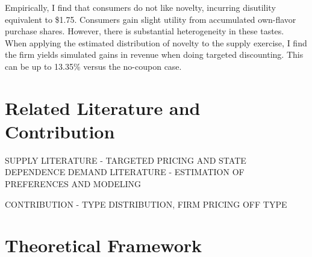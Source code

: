 \documentclass[12pt]{article}
\theoremstyle{definition}
\theoremstyle{remark}
\begin{document}
Empirically, I find that consumers do not like novelty, incurring disutility equivalent to \$1.75. Consumers gain slight utility from accumulated own-flavor purchase shares. However, there is substantial heterogeneity in these tastes. When applying the estimated distribution of novelty to the supply exercise, I find the firm yields simulated gains in revenue when doing targeted discounting. This can be up to 13.35\% versus the no-coupon case.



\section{Related Literature and Contribution}
\label{sec:literature}

SUPPLY LITERATURE - TARGETED PRICING AND STATE DEPENDENCE
DEMAND LITERATURE - ESTIMATION OF PREFERENCES AND MODELING

CONTRIBUTION - TYPE DISTRIBUTION, FIRM PRICING OFF TYPE




\section{Theoretical Framework}
\label{sec:theory}
\end{document}
